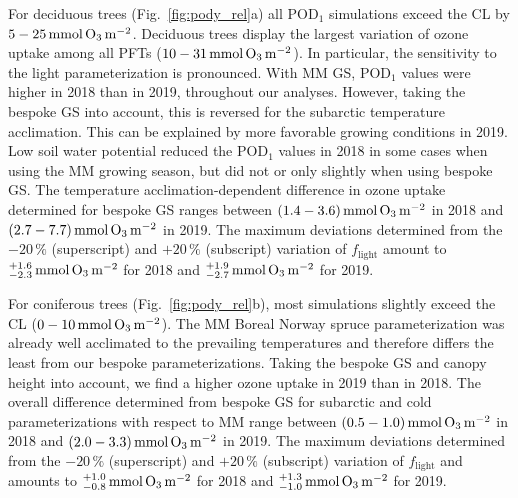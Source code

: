 \documentclass[bg, manuscript]{copernicus}
\begin{document}
For deciduous trees (Fig.~\ref{fig:pody_rel}a) all $\mathrm{POD_1}$ simulations exceed the CL by $5-25\,\unit{mmol\,\chem{O_3}\,m^{-2}}$. Deciduous trees display the largest variation of ozone uptake among all PFTs ($10-31\,\unit{mmol\,\chem{O_3}\,m^{-2}}$). In particular, the sensitivity to the light parameterization is pronounced. With MM GS, $\mathrm{POD_1}$ values were higher in 2018 than in 2019, throughout our analyses. However, taking the bespoke GS into account, this is reversed for the subarctic temperature acclimation. This can be explained by more favorable growing conditions in 2019. Low soil water potential reduced the $\mathrm{POD_1}$ values in 2018 in some cases when using the MM growing season, but did not or only slightly when using bespoke GS. The temperature acclimation-dependent difference in ozone uptake determined for bespoke GS ranges between $(1.4-3.6)\,\unit{mmol\,\chem{O_3}\,m^{-2}}$ in 2018 and $(2.7-7.7)\,\unit{mmol\,\chem{O_3}\,m^{-2}}$ in 2019. The maximum deviations determined from the $-20\,\unit{\%}$ (superscript) and $+20\,\unit{\%}$ (subscript) variation of $f_\mathrm{light}$ amount to $^{+1.6}_{-2.3}\,\unit{mmol\,\chem{O_3}\,m^{-2}}$ for 2018 and $^{+1.9}_{-2.7}\,\unit{mmol\,\chem{O_3}\,m^{-2}}$ for 2019. 

For coniferous trees (Fig.~\ref{fig:pody_rel}b), most simulations slightly exceed the CL ($0-10\,\unit{mmol\,\chem{O_3}\,m^{-2}}$). The MM Boreal Norway spruce parameterization was already well acclimated to the prevailing temperatures and therefore differs the least from our bespoke parameterizations. Taking the bespoke GS and canopy height into account, we find a higher ozone uptake in 2019 than in 2018. The overall difference determined from bespoke GS for subarctic and cold parameterizations with respect to MM range between $(0.5-1.0)\,\unit{mmol\,\chem{O_3}\,m^{-2}}$ in 2018 and $(2.0-3.3)\,\unit{mmol\,\chem{O_3}\,m^{-2}}$ in 2019. The maximum deviations determined from the $-20\,\unit{\%}$ (superscript) and $+20\,\unit{\%}$ (subscript) variation of $f_\mathrm{light}$ and amounts to $^{+1.0}_{-0.8}\,\unit{mmol\,\chem{O_3}\,m^{-2}}$ for 2018 and $^{+1.3}_{-1.0}\,\unit{mmol\,\chem{O_3}\,m^{-2}}$ for 2019.
\end{document}
